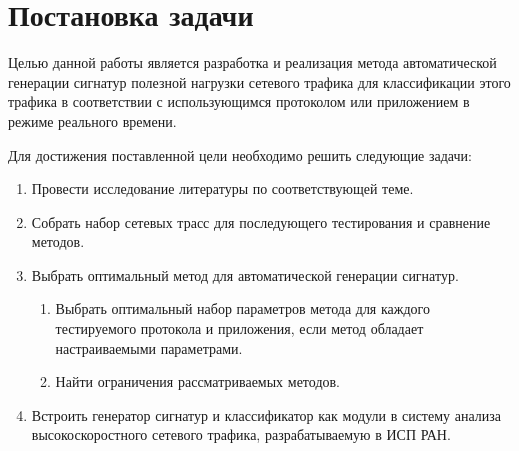 \section{Постановка задачи}
\label{sec:Chapter1} 

Целью данной работы является разработка и реализация метода автоматической генерации сигнатур полезной нагрузки сетевого трафика
для классификации этого трафика в соответствии с использующимся протоколом или приложением в режиме реального времени.

Для достижения поставленной цели необходимо решить следующие задачи:

\begin{enumerate}
    \item Провести исследование литературы по соответствующей теме.
    \item Собрать набор сетевых трасс для последующего тестирования и сравнение методов.
    \item Выбрать оптимальный метод для автоматической генерации сигнатур.
    \begin{enumerate}
        \item Выбрать оптимальный набор параметров метода для каждого тестируемого протокола и приложения, если метод обладает настраиваемыми параметрами.
        \item Найти ограничения рассматриваемых методов.
    \end{enumerate}
    \item Встроить генератор сигнатур и классификатор как модули в систему анализа высокоскоростного сетевого трафика, разрабатываемую в ИСП РАН.
\end{enumerate}

\newpage
